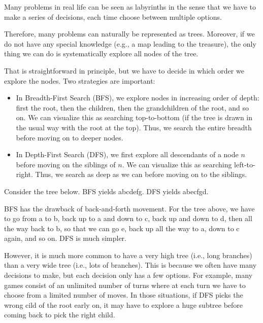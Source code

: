 Many problems in real life can be seen as labyrinths in the sense that we have to make a series of decisions, each time choose between multiple options.

Therefore, many problems can naturally be represented as trees.
Moreover, if we do not have any special knowledge (e.g., a map leading to the treasure), the only thing we can do is systematically explore all nodes of the tree.

That is straightforward in principle, but we have to decide in which order we explore the nodes.
Two strategies are important:
\begin{itemize}
\item In Breadth-First Search (BFS), we explore nodes in increasing order of depth: first the root, then the children, then the grandchildren of the root, and so on.
We can visualize this as searching top-to-bottom (if the tree is drawn in the usual way with the root at the top).
Thus, we search the entire breadth before moving on to deeper nodes.
\item In Depth-First Search (DFS), we first explore all descendants of a node $n$ before moving on the siblings of $n$.
We can visualize this as searching left-to-right.
Thus, we search as deep as we can before moving on to the siblings.
\end{itemize}

Consider the tree below.
BFS yields abcdefg.
DFS yields abecfgd.
\begin{center}
\end{center}

BFS has the drawback of back-and-forth movement.
For the tree above, we have to go from a to b, back up to a and down to c, back up and down to d, then all the way back to b, so that we can go e, back up all the way to a, down to c again, and so on.
DFS is much simpler.

However, it is much more common to have a very high tree (i.e., long branches) than a very wide tree (i.e., lots of branches).
This is because we often have many decisions to make, but each decision only has a few options.
For example, many games consist of an unlimited number of turns where at each turn we have to choose from a limited number of moves.
In those situations, if DFS picks the wrong cild of the root early on, it may have to explore a huge subtree before coming back to pick the right child.

